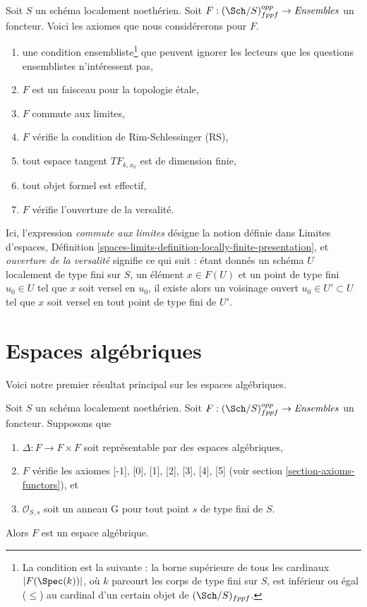 \medskip\noindent
Soit $S$ un schéma localement noethérien. Soit
$F : (\Sch/S)_{fppf}^{opp} \to \textit{Ensembles}$ un foncteur.
Voici les axiomes que nous considérerons pour $F$.
\begin{enumerate}
\item[{[-1]}] une condition ensembliste\footnote{La condition est la
suivante : la borne supérieure de tous les cardinaux
$|F(\Spec(k))|$, où $k$ parcourt les corps de type
fini sur $S$, est inférieur ou égal ($\leq$) au cardinal d'un certain
objet de $(\Sch/S)_{fppf}$.} que peuvent ignorer les
lecteurs que les questions ensemblistes n'intéressent pas,
\item[{[0]}] $F$ est un faisceau pour la topologie \'etale,
\item[{[1]}] $F$ commute aux limites,
\item[{[2]}] $F$ vérifie la condition de Rim-Schlessinger (RS),
\item[{[3]}] tout espace tangent $TF_{k, x_0}$ est de dimension finie,
\item[{[4]}] tout objet formel est effectif,
\item[{[5]}] $F$ vérifie l'ouverture de la versalité.
\end{enumerate}
Ici, l'expression {\it commute aux limites} désigne la notion définie dans
Limites d'espaces, Définition
\ref{spaces-limits-definition-locally-finite-presentation}, et
{\it ouverture de la versalité} signifie ce qui suit : étant donnés un schéma $U$
localement de type fini sur $S$, un élément $x \in F(U)$ et
un point de type fini $u_0 \in U$ tel que $x$ soit versel en $u_0$,
il existe alors un voisinage ouvert $u_0 \in U' \subset U$
tel que $x$ soit versel en tout point de type fini de $U'$.






\section{Espaces algébriques}
\label{section-algebraic-spaces}

\noindent
Voici notre premier résultat principal sur les espaces algébriques.

\begin{proposition}
\label{proposition-spaces-diagonal-representable}
Soit $S$ un schéma localement noethérien. Soit
$F : (\Sch/S)_{fppf}^{opp} \to \textit{Ensembles}$ un foncteur. Supposons que
\begin{enumerate}
\item $\Delta : F \to F \times F$ soit représentable par des espaces algébriques,
\item $F$ vérifie les axiomes [-1], [0], [1], [2], [3], [4], [5]
(voir section \ref{section-axioms-functors}), et
\item $\mathcal{O}_{S, s}$ soit un anneau G pour tout point $s$ de type fini de $S$.
\end{enumerate}
Alors $F$ est un espace algébrique.
\end{proposition}

